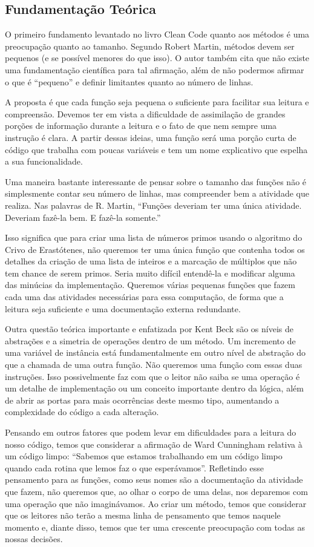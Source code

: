 \subsection{Fundamentação Teórica}
O primeiro fundamento levantado no livro Clean Code quanto aos métodos é uma preocupação quanto ao tamanho. Segundo Robert Martin, métodos devem ser pequenos (e se possível menores do que isso). O autor também cita que não existe uma fundamentação científica para tal afirmação, além de não podermos afirmar o que é “pequeno” e definir limitantes quanto ao número de linhas.
	
A proposta é que cada função seja pequena o suficiente para facilitar sua leitura e compreensão. Devemos ter em vista a dificuldade de assimilação de grandes porções de informação durante a leitura e o fato de que nem sempre uma instrução é clara. A partir dessas ideias, uma função será uma porção curta de código que trabalha com poucas variáveis e tem um nome explicativo que espelha a sua funcionalidade.
	
Uma maneira bastante interessante de pensar sobre o tamanho das funções não é simplesmente contar seu número de linhas, mas compreender bem a atividade que realiza. Nas palavras de R. Martin, “Funções deveriam ter uma única atividade. Deveriam fazê-la bem. E fazê-la somente.”
	
Isso significa que para criar uma lista de números primos usando o algoritmo do Crivo de Erastótenes, não queremos ter uma única função que contenha todos os detalhes da criação de uma lista de inteiros e a marcação de múltiplos que não tem chance de serem primos. Seria muito difícil entendê-la e modificar alguma das minúcias da implementação. Queremos várias pequenas funções que fazem cada uma das atividades necessárias para essa computação, de forma que a leitura seja suficiente e uma documentação externa redundante.
	
Outra questão teórica importante e enfatizada por Kent Beck são os níveis de abstrações e a simetria de operações dentro de um método. Um incremento de uma variável de instância está fundamentalmente em outro nível de abstração do que a chamada de uma outra função. Não queremos uma função com essas duas instruções. Isso possivelmente faz com que o leitor não saiba se uma operação é um detalhe de implementação ou um conceito importante dentro da lógica, além de abrir as portas para mais ocorrências deste mesmo tipo, aumentando a complexidade do código a cada alteração.
	
Pensando em outros fatores que podem levar em dificuldades para a leitura do nosso código, temos que considerar a afirmação de Ward Cunningham relativa à um código limpo: “Sabemos que estamos trabalhando em um código limpo quando cada rotina que lemos faz o que esperávamos”. Refletindo esse pensamento para as funções, como seus nomes são a documentação da atividade que fazem, não queremos que, ao olhar o corpo de uma delas, nos deparemos com uma operação que não imaginávamos. Ao criar um método, temos que considerar que os leitores não terão a mesma linha de pensamento que temos naquele momento e, diante disso, temos que ter uma crescente preocupação com todas as nossas decisões.
	
